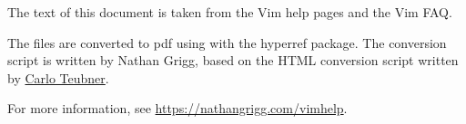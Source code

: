 \begin{minipage}{5in}
The text of this document is taken from the Vim
help pages and the Vim FAQ.

\bigskip

The files are converted to pdf using \engine with the hyperref package.
The conversion script
is written by Nathan Grigg, based on the HTML conversion script written
by \href{http://github.com/c4rlo/vimhelp/}{Carlo Teubner}.

\bigskip

For more information, see
\href{https://nathangrigg.com/vimhelp}{https://nathangrigg.com/vimhelp}.
\end{minipage}
